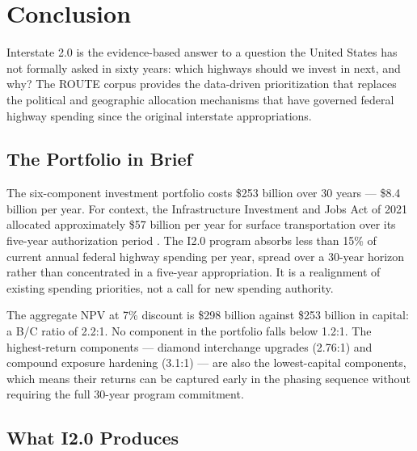 \section{Conclusion}

Interstate 2.0 is the evidence-based answer to a question the United States has not formally asked in sixty years: which highways should we invest in next, and why? The ROUTE corpus provides the data-driven prioritization that replaces the political and geographic allocation mechanisms that have governed federal highway spending since the original interstate appropriations.

\subsection{The Portfolio in Brief}

The six-component investment portfolio costs \$253 billion over 30 years --- \$8.4 billion per year. For context, the Infrastructure Investment and Jobs Act of 2021 allocated approximately \$57 billion per year for surface transportation over its five-year authorization period \citep{IIJA2021}. The I2.0 program absorbs less than 15\% of current annual federal highway spending per year, spread over a 30-year horizon rather than concentrated in a five-year appropriation. It is a realignment of existing spending priorities, not a call for new spending authority.

The aggregate NPV at 7\% discount is \$298 billion against \$253 billion in capital: a B/C ratio of 2.2:1. No component in the portfolio falls below 1.2:1. The highest-return components --- diamond interchange upgrades (2.76:1) and compound exposure hardening (3.1:1) --- are also the lowest-capital components, which means their returns can be captured early in the phasing sequence without requiring the full 30-year program commitment.

\subsection{What I2.0 Produces}

